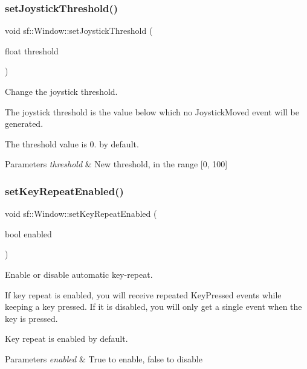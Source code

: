 \subsubsection{\texorpdfstring{set\+Joystick\+Threshold()}{setJoystickThreshold()}}
{\footnotesize\ttfamily void sf\+::\+Window\+::set\+Joystick\+Threshold (\begin{DoxyParamCaption}\item[{float}]{threshold }\end{DoxyParamCaption})}



Change the joystick threshold. 

The joystick threshold is the value below which no Joystick\+Moved event will be generated.

The threshold value is 0. by default.


\begin{DoxyParams}{Parameters}
{\em threshold} & New threshold, in the range \mbox{[}0, 100\mbox{]} \\
\hline
\end{DoxyParams}
\mbox{\label{classsf_1_1_window_aef9f2b14c10ecba8a8df95dd51c5bb73}} 
\subsubsection{\texorpdfstring{set\+Key\+Repeat\+Enabled()}{setKeyRepeatEnabled()}}
{\footnotesize\ttfamily void sf\+::\+Window\+::set\+Key\+Repeat\+Enabled (\begin{DoxyParamCaption}\item[{bool}]{enabled }\end{DoxyParamCaption})}



Enable or disable automatic key-\/repeat. 

If key repeat is enabled, you will receive repeated Key\+Pressed events while keeping a key pressed. If it is disabled, you will only get a single event when the key is pressed.

Key repeat is enabled by default.


\begin{DoxyParams}{Parameters}
{\em enabled} & True to enable, false to disable \\
\hline
\end{DoxyParams}
\mbox{\label{classsf_1_1_window_a5b4ef8ede77531e17b7a0287fa6ff9ce}} 
